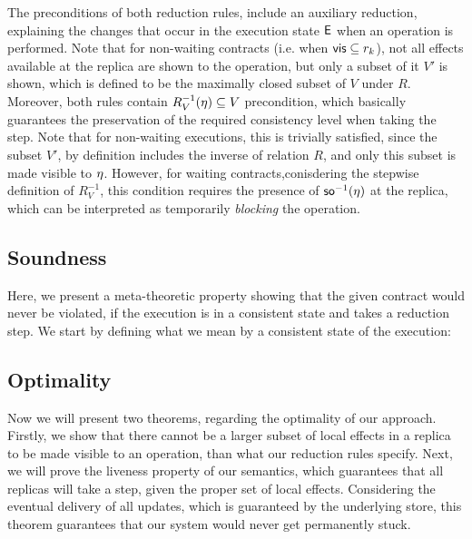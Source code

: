 The preconditions of both reduction rules, include an auxiliary
reduction, explaining the changes that occur in the execution state ${\normalfont \textsf{E}}$
when an operation is performed. Note that for non-waiting contracts
(i.e. when ${\normalfont \textsf{vis}}\subseteq r_k$), 
not all effects available at the replica are shown to the operation, but
only a subset of it $V'$ is shown, which is defined to be the  maximally
closed subset of $V$ under $R$.
Moreover, both rules contain
$R_V^{-1}(\eta)\subseteq V$ precondition, which basically guarantees the
preservation of the required consistency level when taking the step. Note
that for non-waiting executions, this is trivially satisfied, since the
subset $V'$, by definition includes
the inverse of relation $R$, and only this subset is made visible to
$\eta$. However, for waiting contracts,conisdering the stepwise
definition of $R_V^{-1}$, this condition requires the presence of
${\normalfont \textsf{so}}^{-1}(\eta)$ at the replica, which can be
interpreted as temporarily \emph{blocking} the operation.

\subsection{Soundness}
\label{subsec:sound}
Here, we present a meta-theoretic property showing that the given contract would never be
violated, if the execution is in a consistent state and takes a reduction
step. We start by defining what we mean by a consistent state of the
execution: 


\subsection{Optimality}
\label{subsec:opt}
Now we will present two theorems, regarding the optimality of our
approach. Firstly, we show that there
cannot be a larger subset of local effects in a replica to be made
visible to an operation, than what
our reduction rules specify. Next, we will prove the liveness property
of our semantics, which guarantees that all replicas will take a step,
given the proper set of local effects. Considering the eventual delivery of all
updates, which is guaranteed by the underlying store, this theorem
guarantees  that our system would never get permanently stuck. 



